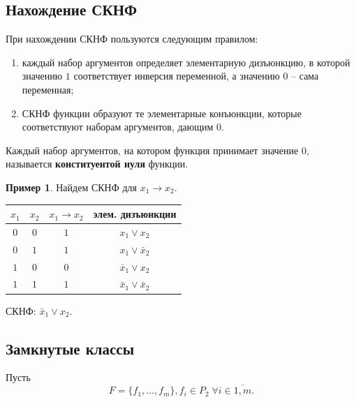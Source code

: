 \documentclass[a5paper, 11pt]{extarticle}
\theoremstyle{definition}
\newtheorem{example}{Пример}[subsection]
\theoremstyle{definition}
\theoremstyle{definition}
\numberwithin{figure}{section}
\numberwithin{table}{section}
\begin{document}
\subsection{Нахождение СКНФ}

\noindent При нахождении СКНФ пользуются следующим правилом:
\begin{enumerate}
    \item каждый набор аргументов определяет элементарную дизъюнкцию, в которой значению \(1\) соответствует инверсия переменной, а значению \(0\) -- сама переменная;
    \item СКНФ функции образуют те элементарные конъюнкции, которые соответствуют наборам аргументов, дающим \(0\).
\end{enumerate}

Каждый набор аргументов, на котором функция принимает значение \(0\), называется \textbf{конституентой нуля} функции.

\begin{example}
    Найдем СКНФ для \(x_1 \to x_2\).

        {
            \renewcommand{\arraystretch}{1.5}
            \begin{longtable}{|c|c|c|c|}
                \hline
                \(x_1\) & \(x_2\) & \(x_1 \to x_2\) & элем. дизъюнкции             \\
                \hline
                \(0\)   & \(0\)   & \(1\)           & \(x_1 \lor x_2\)             \\
                \hline
                \(0\)   & \(1\)   & \(1\)           & \(x_1 \lor \bar{x}_2\)       \\
                \hline
                \(1\)   & \(0\)   & \(0\)           & \(\bar{x}_1 \lor x_2\)       \\
                \hline
                \(1\)   & \(1\)   & \(1\)           & \(\bar{x}_1 \lor \bar{x}_2\) \\
                \hline
            \end{longtable}
        }

    СКНФ: \(\bar{x}_1 \lor x_2\).
\end{example}

\subsection{Замкнутые классы}

Пусть
\[
    F = \{f_1, \ldots, f_m\}, f_i \in P_2 \; \forall i \in \overline{1, m}.
\]
\end{document}
